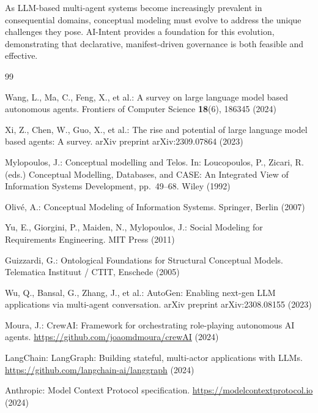 \documentclass[runningheads]{llncs}
\begin{document}
As LLM-based multi-agent systems become increasingly prevalent in consequential domains, conceptual modeling must evolve to address the unique challenges they pose. AI-Intent provides a foundation for this evolution, demonstrating that declarative, manifest-driven governance is both feasible and effective.


\begin{thebibliography}{99}

Wang, L., Ma, C., Feng, X., et al.:
A survey on large language model based autonomous agents.
Frontiers of Computer Science \textbf{18}(6), 186345 (2024)

Xi, Z., Chen, W., Guo, X., et al.:
The rise and potential of large language model based agents: A survey.
arXiv preprint arXiv:2309.07864 (2023)

Mylopoulos, J.:
Conceptual modelling and Telos.
In: Loucopoulos, P., Zicari, R. (eds.) Conceptual Modelling, Databases, and CASE: An Integrated View of Information Systems Development, pp.~49--68. Wiley (1992)

Oliv{\'e}, A.:
Conceptual Modeling of Information Systems.
Springer, Berlin (2007)

Yu, E., Giorgini, P., Maiden, N., Mylopoulos, J.:
Social Modeling for Requirements Engineering.
MIT Press (2011)

Guizzardi, G.:
Ontological Foundations for Structural Conceptual Models.
Telematica Instituut / CTIT, Enschede (2005)

Wu, Q., Bansal, G., Zhang, J., et al.:
AutoGen: Enabling next-gen LLM applications via multi-agent conversation.
arXiv preprint arXiv:2308.08155 (2023)

Moura, J.:
CrewAI: Framework for orchestrating role-playing autonomous AI agents.
\url{https://github.com/joaomdmoura/crewAI} (2024)

LangChain:
LangGraph: Building stateful, multi-actor applications with LLMs.
\url{https://github.com/langchain-ai/langgraph} (2024)

Anthropic:
Model Context Protocol specification.
\url{https://modelcontextprotocol.io} (2024)


\end{thebibliography}
\end{document}

